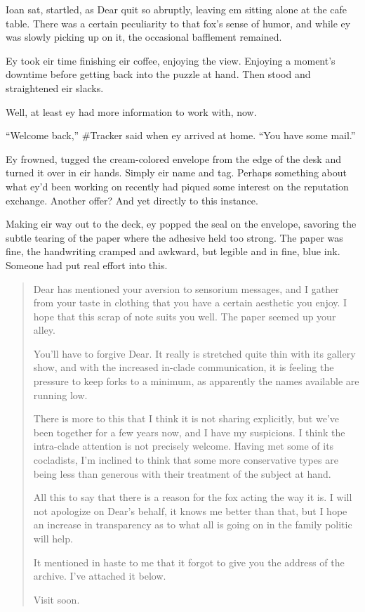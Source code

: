 Ioan sat, startled, as Dear quit so abruptly, leaving em sitting alone at the cafe table. There was a certain peculiarity to that fox's sense of humor, and while ey was slowly picking up on it, the occasional bafflement remained.

Ey took eir time finishing eir coffee, enjoying the view. Enjoying a moment's downtime before getting back into the puzzle at hand. Then stood and straightened eir slacks.

Well, at least ey had more information to work with, now.

``Welcome back,'' \#Tracker said when ey arrived at home. ``You have some mail.''

Ey frowned, tugged the cream-colored envelope from the edge of the desk and turned it over in eir hands. Simply eir name and tag. Perhaps something about what ey'd been working on recently had piqued some interest on the reputation exchange. Another offer? And yet directly to this instance.

Making eir way out to the deck, ey popped the seal on the envelope, savoring the subtle tearing of the paper where the adhesive held too strong. The paper was fine, the handwriting cramped and awkward, but legible and in fine, blue ink. Someone had put real effort into this.

\begin{quote}
Dear has mentioned your aversion to sensorium messages, and I gather from your taste in clothing that you have a certain aesthetic you enjoy. I hope that this scrap of note suits you well. The paper seemed up your alley.

You'll have to forgive Dear. It really is stretched quite thin with its gallery show, and with the increased in-clade communication, it is feeling the pressure to keep forks to a minimum, as apparently the names available are running low.

There is more to this that I think it is not sharing explicitly, but we've been together for a few years now, and I have my suspicions. I think the intra-clade attention is not precisely welcome. Having met some of its cocladists, I'm inclined to think that some more conservative types are being less than generous with their treatment of the subject at hand.

All this to say that there is a reason for the fox acting the way it is. I will not apologize on Dear's behalf, it knows me better than that, but I hope an increase in transparency as to what all is going on in the family politic will help.

It mentioned in haste to me that it forgot to give you the address of the archive. I've attached it below.

Visit soon.
\end{quote}

